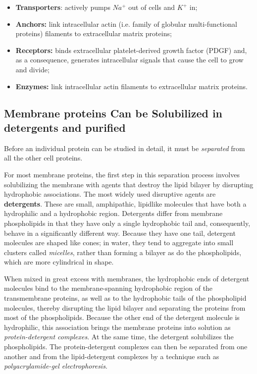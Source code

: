 \begin{itemize}
\item \textbf{Transporters}: actively pumps $Na^{+}$ out of cells and $K^{+}$ in;
\item \textbf{Anchors:} link intracellular actin (i.e. family of globular multi-functional proteins) filaments to extracellular matrix proteins;
\item \textbf{Receptors:} binds extracellular platelet-derived growth factor (PDGF) and, 
as a consequence, generates intracellular signals that cause the cell to grow and divide;
\item \textbf{Enzymes:} link intracellular actin filaments to extracellular matrix proteins.
\end{itemize}

\subsection{Membrane proteins Can be Solubilized in detergents and purified}

Before an individual protein can be studied in detail, it must be \textit{separated}
from all the other cell proteins. 

For most membrane proteins, the first step
in this separation process involves solubilizing the membrane with agents
that destroy the lipid bilayer by disrupting hydrophobic associations. The
most widely used disruptive agents are \textbf{detergents}. These
are small, amphipathic, lipidlike molecules that have both a hydrophilic
and a hydrophobic region. Detergents differ from membrane
phospholipids in that they have only a single hydrophobic tail and,
consequently, behave in a significantly different way. Because they have
one tail, detergent molecules are shaped like cones; in water, they tend to
aggregate into small clusters called \textit{micelles}, rather than forming a bilayer
as do the phospholipids, which are more cylindrical in shape.

When mixed in great excess with membranes, the hydrophobic ends of
detergent molecules bind to the membrane-spanning hydrophobic region
of the transmembrane proteins, as well as to the hydrophobic tails of the
phospholipid molecules, thereby disrupting the lipid bilayer and separating
the proteins from most of the phospholipids. Because the other
end of the detergent molecule is hydrophilic, this association brings the
membrane proteins into solution as \textit{protein-detergent complexes}.
At the same time, the detergent solubilizes the phospholipids. The
protein-detergent complexes can then be separated from one another
and from the lipid-detergent complexes by a technique such as \textit{polyacrylamide-gel
electrophoresis}.

